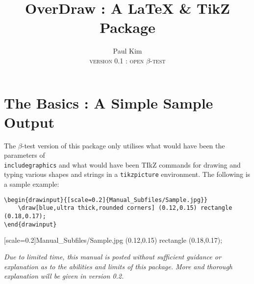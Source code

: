 \documentclass[10pt,a4paper]{article}
\begin{document}
    \title{OverDraw : A \LaTeX{} \& TikZ Package}
    \author{Paul Kim \\ \textsc{version} 0.1 : \textsc{open} $\beta$-\textsc{test}}
    \date{}
\maketitle

\section{The Basics : A Simple Sample Output}
The $\beta$-test version of this package only utilises what would have been the
parameters of \texttt{\\includegraphics} and what would have been TIkZ commands
for drawing and typing various shapes and strings in a \texttt{tikzpicture}
environment. The following is a sample example:
\newline

\begin{verbatim}
\begin{drawinput}{[scale=0.2]{Manual_Subfiles/Sample.jpg}}
    \draw[blue,ultra thick,rounded corners] (0.12,0.15) rectangle (0.18,0.17);
\end{drawinput}
\end{verbatim}

\begin{drawinput}{[scale=0.2]{Manual_Subfiles/Sample.jpg}}
     (0.12,0.15) rectangle (0.18,0.17);
\end{drawinput}

\textit{Due to limited time, this manual is posted without sufficient guidance
or explanation as to the abilities and limits of this package. More and thorough
explanation will be given in version 0.2.}
\end{document}
